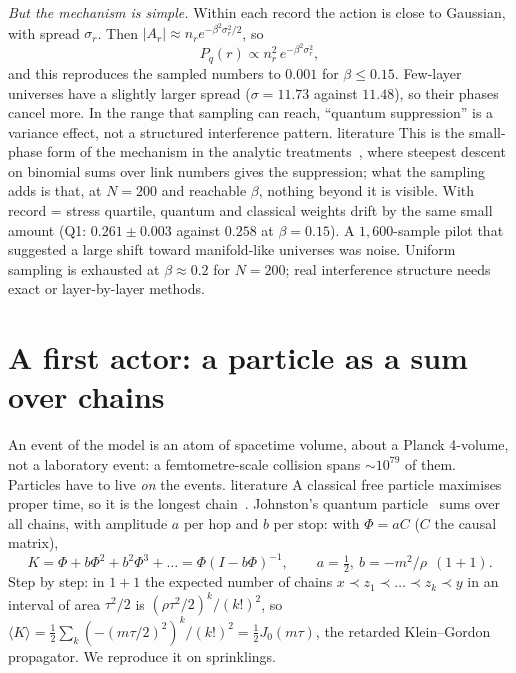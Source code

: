 \documentclass[11pt,a4paper]{article}
\newcommand{\tagbox}[2]{\textsf{\scriptsize\colorbox{#1!12}{\textcolor{#1!70!black}{#2}}}}
\newcommand{\lit}{\tagbox{blue}{literature}}
\begin{document}
\emph{But the mechanism is simple.} Within each record the action is close to Gaussian, with spread $\sigma_r$. Then $|A_r|\approx n_r e^{-\beta^2\sigma_r^2/2}$, so
\begin{equation}
P_q(r)\propto n_r^2\,e^{-\beta^2\sigma_r^2},
\end{equation}
and this reproduces the sampled numbers to $0.001$ for $\beta\le0.15$. Few-layer universes have a slightly larger spread ($\sigma=11.73$ against $11.48$), so their phases cancel more. In the range that sampling can reach, ``quantum suppression'' is a variance effect, not a structured interference pattern. \lit{} This is the small-phase form of the mechanism in the analytic treatments~\cite{LoomisCarlip18,CCS23}, where steepest descent on binomial sums over link numbers gives the suppression; what the sampling adds is that, at $N=200$ and reachable $\beta$, nothing beyond it is visible. With record = stress quartile, quantum and classical weights drift by the same small amount (Q1: $0.261\pm0.003$ against $0.258$ at $\beta=0.15$). A $1{,}600$-sample pilot that suggested a large shift toward manifold-like universes was noise. Uniform sampling is exhausted at $\beta\approx0.2$ for $N=200$; real interference structure needs exact or layer-by-layer methods.

\section{A first actor: a particle as a sum over chains}\label{sec:matter}
An event of the model is an atom of spacetime volume, about a Planck 4-volume, not a laboratory event: a femtometre-scale collision spans $\sim10^{79}$ of them. Particles have to live \emph{on} the events. \lit{} A classical free particle maximises proper time, so it is the longest chain~\cite{BrightwellGregory91}. Johnston's quantum particle~\cite{Johnston08} sums over all chains, with amplitude $a$ per hop and $b$ per stop: with $\Phi=aC$ ($C$ the causal matrix),
\begin{equation}
K=\Phi+b\Phi^2+b^2\Phi^3+\dots=\Phi(I-b\Phi)^{-1},\qquad a=\tfrac12,\ b=-m^2/\rho\ \ (1+1).
\end{equation}
Step by step: in $1+1$ the expected number of chains $x\prec z_1\prec\dots\prec z_k\prec y$ in an interval of area $\tau^2/2$ is $(\rho\tau^2/2)^k/(k!)^2$, so $\langle K\rangle=\tfrac12\sum_k(-(m\tau/2)^2)^k/(k!)^2=\tfrac12J_0(m\tau)$, the retarded Klein--Gordon propagator. We reproduce it on sprinklings.
\end{document}
